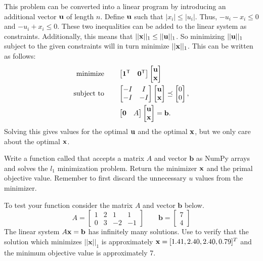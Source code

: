 This problem can be converted into a linear program by introducing an additional vector $\mathbf{u}$ of length $n$.
Define $\mathbf{u}$ such that $|x_i|\leq |u_i|$. 
Thus, $-u_i-x_i\leq 0$ and $-u_i+x_i\leq 0$.
These two inequalities can be added to the linear system as constraints.
Additionally, this means that $||\mathbf{x}||_1\leq ||\mathbf{u}||_1$.
So minimizing $||\mathbf{u}||_1$ subject to the given constraints will in turn minimize $||\mathbf{x}||_1$.
This can be written as follows:
\begin{align*}
\text{minimize}\qquad
&\begin{bmatrix}
\mathbf{1}^{\mathsf T} & \mathbf{0}^{\mathsf T}
\end{bmatrix}
\begin{bmatrix}
\mathbf{u} \\
\mathbf{x}
\end{bmatrix}\\
\text{subject to}\qquad
&\begin{bmatrix}
-I & I\\
-I & -I
\end{bmatrix}
\begin{bmatrix}
\mathbf{u} \\
\mathbf{x}
\end{bmatrix}
\preceq
\begin{bmatrix}
0\\
0
\end{bmatrix},\\
&\begin{bmatrix}
\mathbf{0} & A
\end{bmatrix}
\begin{bmatrix}
\mathbf{u} \\
\mathbf{x}
\end{bmatrix}
=
\mathbf{b}.
\end{align*}
Solving this gives values for the optimal $\mathbf{u}$ and the optimal $\mathbf{x}$, but we only care about the optimal $\mathbf{x}$.

\begin{problem}
Write a function called  that accepts a matrix $A$ and vector $\mathbf{b}$ as NumPy arrays and solves the $l_1$ minimization problem.
Return the minimizer $\mathbf{x}$ and the primal objective value.
Remember to first discard the unnecessary $u$ values from the minimizer.

To test your function consider the matrix $A$ and vector $\mathbf{b}$ below.
\[
A = \begin{bmatrix}
1 & 2 & 1 & 1\\
0 & 3 & -2 & -1
\end{bmatrix} \qquad
\mathbf{b} = \begin{bmatrix}
7 \\
4
\end{bmatrix}
\]
The linear system $A\mathbf{x} = \mathbf{b}$ has infinitely many solutions.
Use  to verify that the solution which minimizes $||\mathbf{x}||_1$ is approximately $\mathbf{x} = [1.41, 2.40, 2.40, 0.79]^T$ and the minimum objective value is approximately 7.
\label{prob:l1}
\end{problem}


